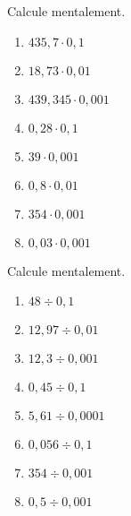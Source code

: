 \begin{exercice}
Calcule mentalement.
\begin{enumerate} 
 \item $435,7 \cdot 0,1$ \dotfill \hspace*{11em}
 
 \item $18,73 \cdot 0,01$ \dotfill \hspace*{11em}
 
 \item $439,345 \cdot 0,001$ \dotfill \hspace*{11em}
 
 \item $0,28 \cdot 0,1$ \dotfill \hspace*{11em}
 
 \item $39 \cdot 0,001$ \dotfill \hspace*{11em}
 
 \item $0,8 \cdot 0,01$ \dotfill \hspace*{11em}
 
 \item $354 \cdot 0,001$ \dotfill \hspace*{11em}
 
 \item $0,03 \cdot 0,001$ \dotfill \hspace*{11em}
 
 \end{enumerate}
\end{exercice}

\begin{exercice}
Calcule mentalement.
\begin{enumerate} 
 \item $48 \div 0,1$ \dotfill \hspace*{11em}
 
 \item $12,97 \div 0,01$ \dotfill \hspace*{11em}

 \item $12,3 \div 0,001$ \dotfill \hspace*{11em}
 
 \item $0,45 \div 0,1$ \dotfill \hspace*{11em}
 	
 \item $5,61 \div 0,0001$ \dotfill \hspace*{11em}
 	
 \item $0,056 \div 0,1$ \dotfill \hspace*{11em}
 
 \item $354 \div 0,001$ \dotfill \hspace*{11em}
 
 \item $0,5 \div 0,001$ \dotfill \hspace*{11em}

 \end{enumerate}
\end{exercice}


